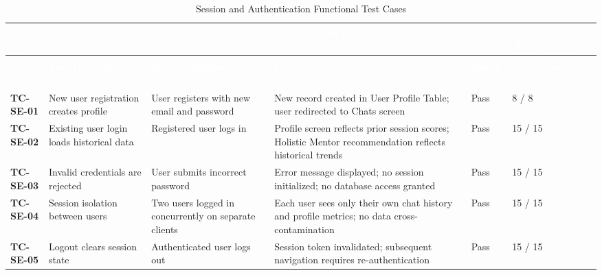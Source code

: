 \begin{longtable}{>{\bfseries}p{1.2cm} p{3.0cm} p{3.5cm} p{4.5cm} p{1.0cm} p{1.5cm}}
\caption{Session and Authentication Functional Test Cases}
\label{tab:tc-se} \\
 
\rowcolor{headerblue}
\textcolor{white}{\textbf{TC-SE}} &
\textcolor{white}{\textbf{Test Description}} &
\textcolor{white}{\textbf{Input / Trigger}} &
\textcolor{white}{\textbf{Expected Output}} &
\textcolor{white}{\textbf{Result}} &
\textcolor{white}{\textbf{Stress Test (Pass/Total)}} \\
\endfirsthead
 
\multicolumn{6}{c}{\tablename\ \thetable{} -- continued} \\
\rowcolor{headerblue}
\textcolor{white}{\textbf{TC-SE}} &
\textcolor{white}{\textbf{Test Description}} &
\textcolor{white}{\textbf{Input / Trigger}} &
\textcolor{white}{\textbf{Expected Output}} &
\textcolor{white}{\textbf{Result}} &
\textcolor{white}{\textbf{Stress Test (Pass/Total)}} \\
\endhead
 
\midrule
TC-SE-01 & New user registration creates profile & User registers with new email and password & New record created in User Profile Table; user redirected to Chats screen & Pass & 8 / 8 \\
\midrule
TC-SE-02 & Existing user login loads historical data & Registered user logs in & Profile screen reflects prior session scores; Holistic Mentor recommendation reflects historical trends & Pass & 15 / 15 \\
\midrule
TC-SE-03 & Invalid credentials are rejected & User submits incorrect password & Error message displayed; no session initialized; no database access granted & Pass & 15 / 15 \\
\midrule
TC-SE-04 & Session isolation between users & Two users logged in concurrently on separate clients & Each user sees only their own chat history and profile metrics; no data cross-contamination & Pass & 15 / 15 \\
\midrule
TC-SE-05 & Logout clears session state & Authenticated user logs out & Session token invalidated; subsequent navigation requires re-authentication & Pass & 15 / 15 \\
\bottomrule
\end{longtable}

